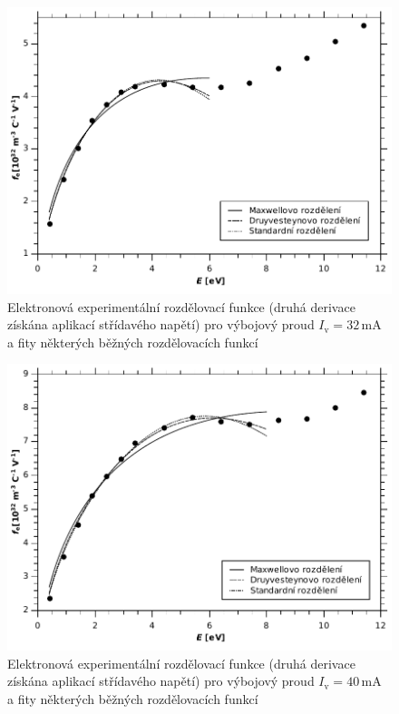 \documentclass[12pt]{article}
\begin{document}
\begin{figure}[htbp]
\begin{center}
\includegraphics[width=12cm]{iv32druv-img.pdf}
\caption{Elektronová experimentální rozdělovací funkce (druhá derivace získána aplikací střídavého napětí) pro výbojový proud $I_\mathrm{v} = 32$\,mA a fity některých běžných rozdělovacích funkcí}
\label{iv32d}
\end{center}
\end{figure}

\begin{figure}[htbp]
\begin{center}
\includegraphics[width=12cm]{iv40druv-img.pdf}
\caption{Elektronová experimentální rozdělovací funkce (druhá derivace získána aplikací střídavého napětí) pro výbojový proud $I_\mathrm{v} = 40$\,mA a fity některých běžných rozdělovacích funkcí}
\label{iv40d}
\end{center}
\end{figure}
\end{document}
